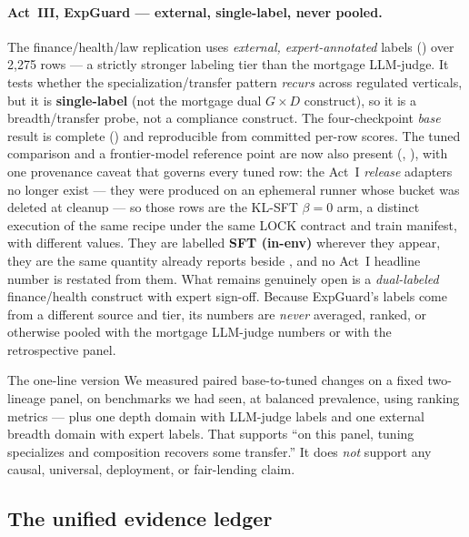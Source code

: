 \paragraph{Act~III, ExpGuard --- external, single-label, never pooled.} The finance/health/law replication uses \emph{external, expert-annotated} labels () over 2{,}275 rows --- a strictly stronger labeling tier than the mortgage LLM-judge. It tests whether the specialization/transfer pattern \emph{recurs} across regulated verticals, but it is \textbf{single-label} (not the mortgage dual $G\times D$ construct), so it is a breadth/transfer probe, not a compliance construct. The four-checkpoint \emph{base} result is complete () and reproducible from committed per-row scores. The tuned comparison and a frontier-model reference point are now also present (, ), with one provenance caveat that governs every tuned row: the Act~I \emph{release} adapters no longer exist --- they were produced on an ephemeral runner whose bucket was deleted at cleanup --- so those rows are the KL-SFT $\beta=0$ arm, a distinct execution of the same recipe under the same LOCK contract and train manifest, with different  values. They are labelled \textbf{SFT (in-env)} wherever they appear, they are the same  quantity  already reports beside , and no Act~I headline number is restated from them. What remains genuinely open is a \emph{dual-labeled} finance/health construct with expert sign-off. Because ExpGuard's labels come from a different source and tier, its numbers are \emph{never} averaged, ranked, or otherwise pooled with the mortgage LLM-judge numbers or with the retrospective panel.

\begin{takeaway}{The one-line version}
We measured paired base-to-tuned changes on a fixed two-lineage panel, on benchmarks we had seen, at balanced prevalence, using ranking metrics --- plus one depth domain with LLM-judge labels and one external breadth domain with expert labels. That supports ``on this panel, tuning specializes and composition recovers some transfer.'' It does \emph{not} support any causal, universal, deployment, or fair-lending claim.
\end{takeaway}

\subsection{The unified evidence ledger}
\label{sec:ledger}

